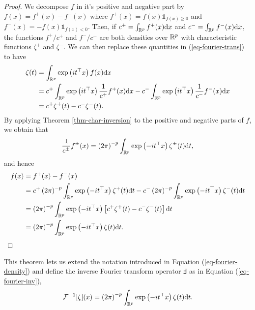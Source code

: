 \begin{proof}
    We decompose $f$ in it's positive and negative part by $f(x) = f^+(x) - f^-(x)$ where $f^+(x) = f(x) \mathbb{1}_{f(x) \geq 0}$ and $f^-(x) = -f(x) \mathbb{1}_{f(x) < 0}$. Then, if $c^+ = \int_{\mathbb{R}^p} f^+(x) \text{d} x$ and $c^- = \int_{\mathbb{R}^p} f^-(x) \text{d} x$, the functions $f^+ / c^+$ and $f^- / c^-$ are both densities over ${\mathbb{R}^p}$ with characteristic functions $\zeta^+$ and $\zeta^-$. We can then replace these quantities in (\ref{eq-fourier-trans}) to have
    \begin{align*}
        \zeta(t) 
        &= \int_{\mathbb{R}^p} \exp\left(it^\top x\right)f(x)\text{d} x \\
        &= c^+ \int_{\mathbb{R}^p} \exp\left(it^\top x\right) \frac{1}{c^+}f^+(x)\text{d} x - c^- \int_{\mathbb{R}^p} \exp\left(it^\top x\right) \frac{1}{c^-}f^-(x)\text{d} x\\
        &= c^+ \zeta^+(t) - c^-\zeta^-(t).
    \end{align*}
    By applying Theorem \ref{thm-char-inversion} to the positive and negative parts of $f$, we obtain that
    \begin{equation*}
        \frac{1}{c^\pm} f^\pm(x) = \left(2\pi\right)^{-p}\int_{\mathbb{R}^p} \exp\left(-i t^\top x\right) \zeta^\pm(t) \text{d} t,
    \end{equation*}
    and hence
    \begin{align*}
        f(x) 
        &= f^+(x) - f^-(x) \\
        &= c^+ \left(2\pi\right)^{-p}\int_{\mathbb{R}^p} \exp\left(-i t^\top x\right) \zeta^+(t) \text{d} t
         - c^- \left(2\pi\right)^{-p}\int_{\mathbb{R}^p} \exp\left(-i t^\top x\right) \zeta^-(t) \text{d} t \\
        &= \left(2\pi\right)^{-p}\int_{\mathbb{R}^p} \exp\left(-i t^\top x\right) \left[ c^+\zeta^+(t) - c^-\zeta^-(t)\right] \text{d} t\\
        &= \left(2\pi\right)^{-p}\int_{\mathbb{R}^p} \exp\left(-i t^\top x\right) \zeta(t) \text{d} t.
    \end{align*}
\end{proof}

This theorem lets us extend the notation introduced in Equation (\ref{eq-fourier-density}) and define the inverse Fourier transform operator $\Finv$ as in Equation (\ref{eq-fourier-inv}),
\begin{equation*}
    {\mathcal{F}^{-1}}[\zeta](x) = \left(2\pi\right)^{-p}\int_{\mathbb{R}^p} \exp\left(-i t^\top x\right) \zeta(t) \text{d} t.
\end{equation*}


